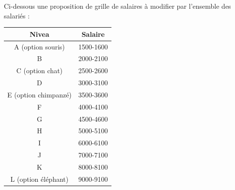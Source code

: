 \documentclass[12pt]{article}
\begin{document}
 Ci-dessous une proposition de grille de salaires à modifier par l'ensemble des salariés :
  \begin{tabular}{| c | c |}
    \hline
    Nivea & Salaire \\ 
    \hline
    A (option souris) & 1500-1600 \\
    \hline
    B & 2000-2100 \\
    \hline
    C (option chat) & 2500-2600 \\
    \hline
    D & 3000-3100 \\
    \hline
    E (option chimpanzé) & 3500-3600 \\
    \hline
    F & 4000-4100 \\
    \hline
    G & 4500-4600 \\
    \hline
    H & 5000-5100 \\
    \hline
    I & 6000-6100 \\
    \hline
    J & 7000-7100 \\
    \hline
    K & 8000-8100 \\
    \hline
    L (option éléphant) & 9000-9100 \\
    \hline
  \end{tabular}
\end{document}
